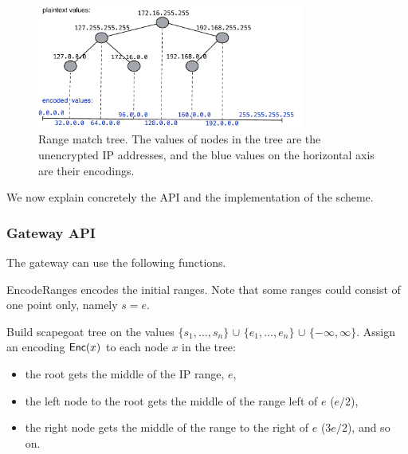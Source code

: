 \begin{figure}
  \includegraphics[width=3.45in]{fig/tree}
  \caption{\label{fig:tree} Range match tree. The values of nodes in the tree are the unencrypted IP addresses, and the blue values on the horizontal axis are their encodings. }
\end{figure}




We now explain concretely the API and the implementation of the scheme. 

\subsubsection{Gateway API}

The gateway can use the following functions. 

EncodeRanges encodes the initial ranges. Note that some ranges could consist of
one point only, namely $s = e$. 


\begin{framed}
\begin{algorithmic}[1]

  \State Build scapegoat tree on the values 
              $\{s_1, \dots, s_n\}$ 
              $\cup$ $\{e_1, \dots, e_n\}$ 
              $\cup$ $\{-\infty, \infty\}$.
  \State Assign an encoding $\mathsf{Enc}(x)$ to each node $x$ in the tree:
  \begin{itemize}
  \item the root gets the middle of the IP range, $e$, 
  \item the left node to the root gets the middle of the range left of $e$ ($e/2$),
  \item the right node gets the middle of the range
  to the right of $e$ ($3e/2$), and so on.
  \end{itemize}

  \State {}
\EndProcedure

\end{algorithmic}
\end{framed}

